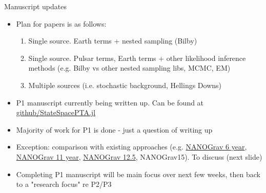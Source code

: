 \documentclass[10pt]{beamer}
\begin{document}
	
		\begin{frame}{Manuscript updates}
		
		
		
		\begin{itemize}
			\item Plan for papers is as follows:
			\begin{enumerate}
				\item Single source. Earth terms + nested sampling (Bilby) 
				\item Single source. Pulsar terms, Earth terms + other likelihood inference methods (e.g. Bilby vs other nested sampling libs, MCMC, EM)
				\item Multiple sources (i.e. stochastic background, Hellings Downs)
			\end{enumerate}
			\item P1 manuscript currently being written up. Can be found at \href{https://github.com/tomkimpson/StateSpacePTA.jl/blob/main/docs/manuscript/paper.pdf}{github/StateSpacePTA.jl} 
			\item Majority of work for P1 is done - just a question of writing up
			\item Exception: comparison with existing approaches (e.g. \href{https://ui.adsabs.harvard.edu/abs/2014ApJ...794..141A/abstract}{NANOGrav 6 year}, \href{https://ui.adsabs.harvard.edu/abs/2019ApJ...880..116A/abstract}{NANOGrav 11 year}, \href{https://ui.adsabs.harvard.edu/abs/2023arXiv230103608A/abstract}{NANOGrav 12.5}, NANOGrav15). \alert{To discuss (next slide)}
			\item Completing P1 manuscript will be main focus over next few weeks, then back to a "research focus" re P2/P3
		\end{itemize}
		
	\end{frame}
\end{document}
